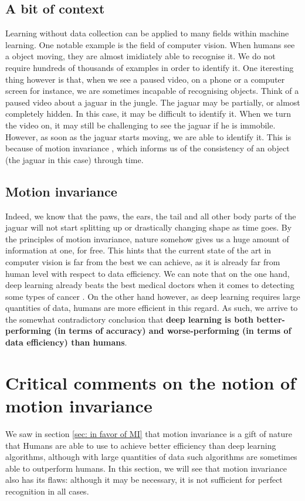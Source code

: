 \documentclass[12pt]{article}
\begin{document}
\subsection{A bit of context}
Learning without data collection can be applied to many fields within machine learning. One notable example is the field of computer vision. When humans see a object moving, they are almost imidiately able to recognise it. We do not require hundreds of thousands of examples in order to identify it. One iteresting thing however is that, when we see a paused video, on a phone or a computer screen for instance, we are sometimes incapable of recognising objects. Think of a paused video about a jaguar in the jungle. The jaguar may be partially, or almost completely hidden. In this case, it may be difficult to identify it. When we turn the video on, it may still be challenging to see the jaguar if he is immobile. However, as soon as the jaguar starts moving, we are able to identify it. This is because of motion invariance \cite{gori2022}, which informs us of the consistency of an object (the jaguar in this case) through time.

\subsection{Motion invariance}
Indeed, we know that the paws, the ears, the tail and all other body parts of the jaguar will not start splitting up or drastically changing shape as time goes. By the principles of motion invariance, nature somehow gives us a huge amount of information at one, for free. This hints that the current state of the art in computer vision is far from the best we can achieve, as it is already far from human level with respect to data efficiency. We can note that on the one hand, deep learning already beats the best medical doctors when it comes to detecting some types of cancer \cite{shen2019}. On the other hand however, as deep learning requires large quantities of data, humans are more efficient in this regard. As such, we arrive to the somewhat contradictory conclusion that \textbf{deep learning is both better-performing (in terms of accuracy) and worse-performing (in terms of data efficiency) than humans}.

\section{Critical comments on the notion of motion invariance}
We saw in section \ref{sec: in favor of MI} that motion invariance is a gift of nature that Humans are able to use to achieve better efficiency than deep learning algorithms, although with large quantities of data such algorithms are sometimes able to outperform humans. In this section, we will see that motion invariance also has its flaws: although it may be necessary, it is not sufficient for perfect recognition in all cases.
\end{document}
